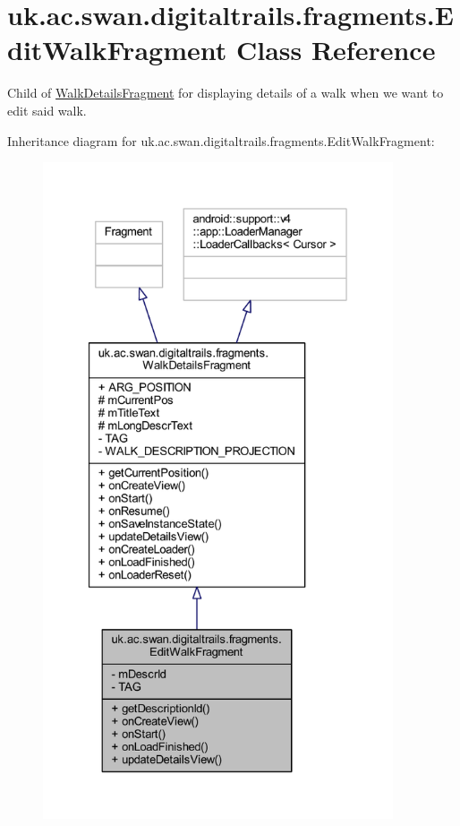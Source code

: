 \hypertarget{classuk_1_1ac_1_1swan_1_1digitaltrails_1_1fragments_1_1_edit_walk_fragment}{\section{uk.\+ac.\+swan.\+digitaltrails.\+fragments.\+Edit\+Walk\+Fragment Class Reference}
\label{classuk_1_1ac_1_1swan_1_1digitaltrails_1_1fragments_1_1_edit_walk_fragment}
}


Child of \hyperlink{classuk_1_1ac_1_1swan_1_1digitaltrails_1_1fragments_1_1_walk_details_fragment}{Walk\+Details\+Fragment} for displaying details of a walk when we want to edit said walk.  




Inheritance diagram for uk.\+ac.\+swan.\+digitaltrails.\+fragments.\+Edit\+Walk\+Fragment\+:
\nopagebreak
\begin{figure}[H]
\begin{center}
\leavevmode
\includegraphics[height=550pt]{classuk_1_1ac_1_1swan_1_1digitaltrails_1_1fragments_1_1_edit_walk_fragment__inherit__graph}
\end{center}
\end{figure}


